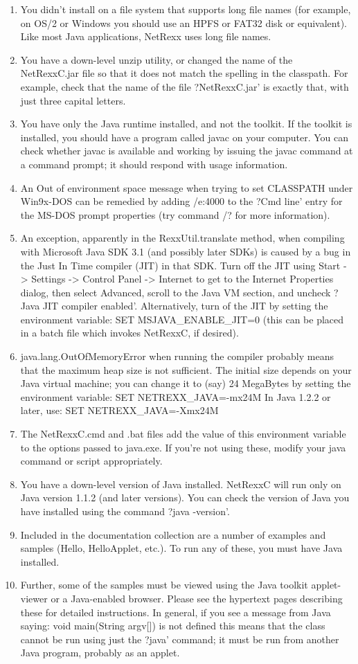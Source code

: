 \begin{enumerate}
\item You didn't install on a file system that supports long file names (for example, on OS/2 or Windows you should use an HPFS or FAT32 disk or equivalent). Like most Java applications, NetRexx uses long file names.
\item You have a down-level unzip utility, or changed the name of the NetRexxC.jar file so that it does not match the spelling in the classpath. For example, check that the name of the file ?NetRexxC.jar’ is exactly that, with just three capital letters.
\item You have only the Java runtime installed, and not the toolkit. If the toolkit is installed, you should have a program called javac on your computer. You can check whether javac is available and working by issuing the javac command at a command prompt; it should respond with usage information.
\item An Out of environment space message when trying to set CLASSPATH under Win9x-DOS can be remedied by adding /e:4000 to the ?Cmd line’ entry for the MS-DOS prompt properties (try command /? for more information).
\item An exception, apparently in the RexxUtil.translate method, when compiling with Microsoft Java SDK 3.1 (and possibly later SDKs) is caused by a bug in the Just In Time compiler (JIT) in that SDK. Turn off the JIT using Start -> Settings -> Control Panel -> Internet to get to the Internet Properties dialog, then select Advanced, scroll to the Java VM section, and uncheck ?Java JIT compiler enabled’. Alternatively, turn of the JIT by setting the environment variable:
  SET MSJAVA\_ENABLE\_JIT=0
(this can be placed in a batch file which invokes NetRexxC, if desired).
\item java.lang.OutOfMemoryError when running the compiler probably means that the maximum heap size is not sufficient. The initial size depends on your Java virtual machine; you can change it to (say) 24 MegaBytes by setting the environment variable:
  SET NETREXX\_JAVA=-mx24M
In Java 1.2.2 or later, use:
  SET NETREXX\_JAVA=-Xmx24M
\item The NetRexxC.cmd and .bat files add the value of this environment variable to the options passed to java.exe. If you're not using these, modify your java command or script appropriately.
\item You have a down-level version of Java installed. NetRexxC will run only on Java version 1.1.2 (and later versions). You can check the version of Java you have installed using the command ?java -version’.
\item Included in the documentation collection are a number of examples and samples (Hello, HelloApplet, etc.). To run any of these, you must have Java installed.
\item Further, some of the samples must be viewed using the Java toolkit applet-viewer or a Java-enabled browser. Please see the hypertext pages describing these for detailed instructions. In general, if you see a message from Java saying:
  void main(String argv[]) is not defined
this means that the class cannot be run using just the ?java’ command; it must be run from another Java program, probably as an applet.
\end{enumerate} 